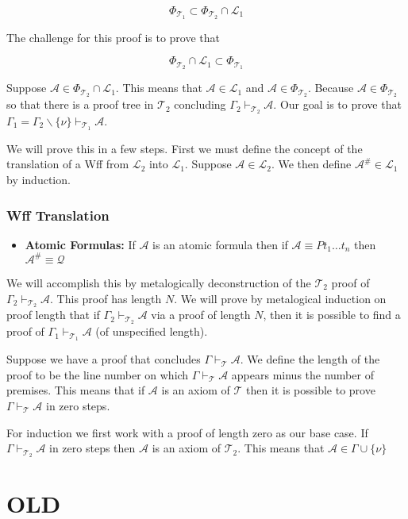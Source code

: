 \documentclass[12pt]{article}
\newcommand{\mc}[1]{\mathcal{#1}}
\begin{document}
$$
\Phi_{\mc{T}_1} \subset \Phi_{\mc{T}_2} \cap \mc{L}_1
$$

The challenge for this proof is to prove that 

$$
\Phi_{\mc{T}_2} \cap \mc{L}_1 \subset \Phi_{\mc{T}_1}
$$

Suppose $\mc{A} \in \Phi_{\mc{T}_2} \cap \mc{L}_1$.
This means that $\mc{A} \in \mc{L}_1$ and $\mc{A} \in \Phi_{\mc{T}_2}$.
Because $\mc{A} \in \Phi_{\mc{T}_2}$ so that there is a proof tree in $\mc{T}_2$ concluding $\Gamma_2 \vdash_{\mc{T}_2} \mc{A}$.
Our goal is to prove that $\Gamma_1 = \Gamma_2 \backslash \{\nu\} \vdash_{\mc{T}_1} \mc{A}$.

We will prove this in a few steps.
First we must define the concept of the translation of a Wff from $\mc{L}_2$ into $\mc{L}_1$.
Suppose $\mc{A} \in \mc{L}_2$. 
We then define $\mc{A}^\# \in \mc{L}_1$ by induction.

\hrulefill
\subsubsection*{Wff Translation}
\begin{itemize}
\item{\textbf{Atomic Formulas:} If $\mc{A}$ is an atomic formula then if $\mc{A} \equiv Pt_1\ldots t_n$ then $\mc{A}^\# \equiv \mc{Q}$}
\end{itemize}
\hrulefill


We will accomplish this by metalogically deconstruction of the $\mc{T}_2$ proof of $\Gamma_2 \vdash_{\mc{T}_2} \mc{A}$.
This proof has length $N$.
We will prove by metalogical induction on proof length that if $\Gamma_2 \vdash_{\mc{T}_2} \mc{A}$ via a proof of length $N$, then it is possible to find a proof of $\Gamma_1 \vdash_{\mc{T}_1} \mc{A}$ (of unspecified length).

Suppose we have a proof that concludes $\Gamma \vdash_{\mc{T}} \mc{A}$. 
We define the length of the proof to be the line number on which $\Gamma \vdash_{\mc{T}} \mc{A}$ appears minus the number of premises.
This means that if $\mc{A}$ is an axiom of $\mc{T}$ then it is possible to prove $\Gamma \vdash_{\mc{T}} \mc{A}$ in zero steps.

For induction we first work with a proof of length zero as our base case.
If $\Gamma \vdash_{\mc{T}_2} \mc{A}$ in zero steps then $\mc{A}$ is an axiom of $\mc{T}_2$.
This means that $\mc{A} \in \Gamma \cup \{\nu\}$



\newpage
\section{OLD}
\end{document}
